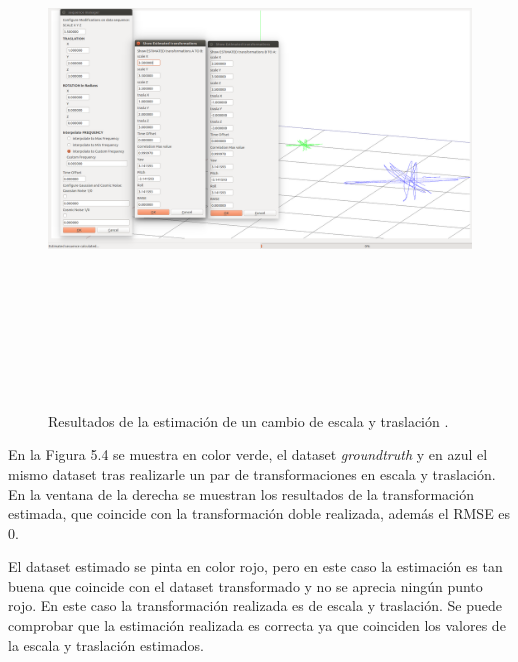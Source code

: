 \begin{figure}[H]
\begin{center}
\label{fig:traslaEscalaTest}\includegraphics[height=14.0cm,width=18.0cm]{img/cap6/Escala_Traslacion_abba.png}
\hspace{0.5cm}

\end{center}

\caption{Resultados de la estimación de un cambio de escala y traslación .}
\end{figure}

En la Figura 5.4 se muestra en color verde, el dataset \textit{groundtruth} y en azul el mismo dataset tras realizarle un par de transformaciones en escala y traslación.
En la ventana de la derecha se muestran los resultados de la transformación estimada, que coincide con la transformación doble realizada, además el RMSE es 0.

El dataset estimado se pinta en color rojo, pero en este caso la estimación es tan buena que coincide con el dataset transformado y no se aprecia ningún punto rojo.
En este caso la transformación realizada es de escala y traslación. Se puede comprobar que la estimación realizada es correcta ya que coinciden los valores de la escala y traslación estimados.


